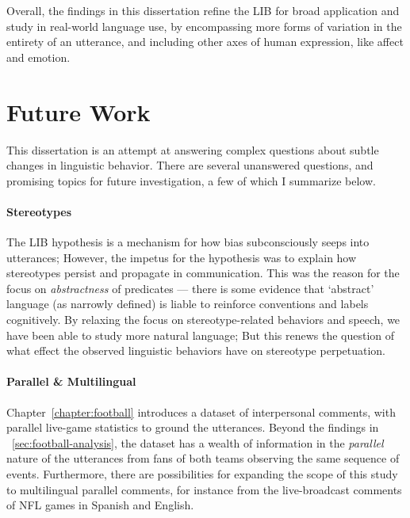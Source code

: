 Overall, the findings in this dissertation refine the LIB for broad application and study in real-world language use, by encompassing more forms of variation in the entirety of an utterance, and including other axes of human expression, like affect and emotion. 

\section{Future Work}

This dissertation is an attempt at answering complex questions about subtle changes in linguistic behavior. There are several unanswered questions, and promising topics for future investigation, a few of which I summarize below.

\paragraph{Stereotypes} The LIB hypothesis is a mechanism for how bias subconsciously seeps into utterances; However, the impetus for the hypothesis was to explain how stereotypes persist and propagate in communication. This was the reason for the focus on \emph{abstractness} of predicates --- there is some evidence that `abstract' language (as narrowly defined) is liable to reinforce conventions and labels cognitively. By relaxing the focus on stereotype-related behaviors and speech, we have been able to study more natural language; But this renews the question of what effect the observed linguistic behaviors have on stereotype perpetuation.

\paragraph{Parallel \& Multilingual} Chapter~\ref{chapter:football} introduces a dataset of interpersonal comments, with parallel live-game statistics to ground the utterances. Beyond the findings in \textsection~\ref{sec:football-analysis}, the dataset has a wealth of information in the \emph{parallel} nature of the utterances from fans of both teams observing the same sequence of events. Furthermore, there are possibilities for expanding the scope of this study to multilingual parallel comments, for instance from the live-broadcast comments of NFL games in Spanish and English. 

